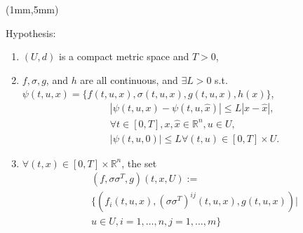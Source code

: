 \begin{frame}[plain]
    \begin{textblock*}{70mm}(1mm,5mm)
        \begin{graybox}{Hypothesis:}
            \begin{enumerate}[(\textbf{{SE}}-1)]
                \item<1->
                    $(U,d)$ is a compact metric space and $T>0$,
                \item<2->
                    $f,\sigma,g$, and $h$ are all continuous, and 
                    $\exists L>0$ 
                    s.t.
                    $
                        \psi(t,u,x)=
                            \{f(t,u,x),
                                \sigma(t,u,x),
                                g(t,u,x),
                                h(x)
                            \}
                   $, 
                    \hspace{-5mm}
                    \begin{align*}
                        &|\psi(t,u,x)-\psi(t,u,\hat{x})|
                                \leq L|x-\hat{x}|,
                        \\
                            &
                                \forall t
                                \in [0,T], x,
                                \hat{x}
                                \in 
                                \mathbb{R}^n,u \in U,
                        \\
                        &|\psi(t,u,0)|
                            \leq 
                                L \forall (t,u)
                                \in[0,T] \times U.
                    \end{align*}  
                \item<3->
                    $\forall (t,x)\in [0,T]\times \mathbb{R}^n$, the set
                    \hspace{-5mm}
                    \begin{align*}
                        &(f,\sigma\sigma^T,g)(t,x,U)
                        :=
                        \\
                        &\{(
                                f_i(t,u,x),
                                (\sigma\sigma^T)^{ij}(t,u,x),g(t,u,x))|
                        \\
                        &
                        u\in U,i=1,\ldots,n,j=1,\ldots,m\}
                    \end{align*}

\end{enumerate}
\end{graybox}
\end{textblock*}
\end{frame}
